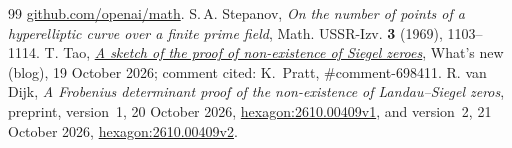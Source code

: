 \documentclass[11pt]{amsart}
\theoremstyle{remark}
\begin{document}
\begin{thebibliography}{99}
\href{https://github.com/openai/math/blob/adc7f1241b42e322a6451854ab7e4b4c146bf78a/preprints/Uniform-exclusion-of-Landau-Siegel-zeros-October-1-2026/paper.pdf}{github.com/openai/math}.
 S.\,A. Stepanov, \emph{On the number of points of a hyperelliptic curve over a
finite prime field}, Math. USSR-Izv. \textbf{3} (1969), 1103--1114.
 T. Tao, \href{https://terrytao.wordpress.com/2026/10/19/a-sketch-of-the-proof-of-non-existence-of-siegel-zeroes/}{\emph{A sketch of the proof of non-existence of Siegel zeroes}}, What's new (blog), 19 October 2026; comment cited: K.~Pratt, \#comment-698411.
 R. van Dijk, \emph{A Frobenius determinant proof of the non-existence of
Landau--Siegel zeros}, preprint, version~1, 20 October 2026,
\href{https://hexagonmath.org/abs/2610.00409v1}{hexagon:2610.00409v1}, and version~2, 21 October 2026,
\href{https://hexagonmath.org/abs/2610.00409v2}{hexagon:2610.00409v2}.
\end{thebibliography}
\end{document}
